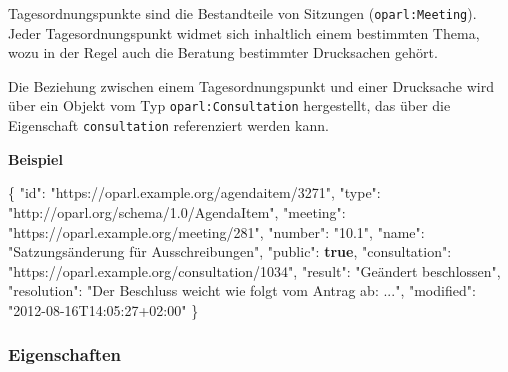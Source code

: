 \documentclass[,a4paper]{article}
\newenvironment{Shaded}{}{}
\newcommand{\KeywordTok}[1]{\textcolor[rgb]{0.00,0.44,0.13}{\textbf{{#1}}}}
\newcommand{\DataTypeTok}[1]{\textcolor[rgb]{0.56,0.13,0.00}{{#1}}}
\newcommand{\StringTok}[1]{\textcolor[rgb]{0.25,0.44,0.63}{{#1}}}
\newcommand{\FunctionTok}[1]{\textcolor[rgb]{0.02,0.16,0.49}{{#1}}}
\begin{document}

Tagesordnungspunkte sind die Bestandteile von Sitzungen
(\texttt{oparl:Meeting}). Jeder Tagesordnungspunkt widmet sich
inhaltlich einem bestimmten Thema, wozu in der Regel auch die Beratung
bestimmter Drucksachen gehört.

Die Beziehung zwischen einem Tagesordnungspunkt und einer Drucksache
wird über ein Objekt vom Typ \texttt{oparl:Consultation} hergestellt,
das über die Eigenschaft \texttt{consultation} referenziert werden kann.

\textbf{Beispiel}

\begin{Shaded}
\begin{Highlighting}[]
\FunctionTok{\{}
    \DataTypeTok{"id"}\FunctionTok{:} \StringTok{"https://oparl.example.org/agendaitem/3271"}\FunctionTok{,}
    \DataTypeTok{"type"}\FunctionTok{:} \StringTok{"http://oparl.org/schema/1.0/AgendaItem"}\FunctionTok{,}
    \DataTypeTok{"meeting"}\FunctionTok{:} \StringTok{"https://oparl.example.org/meeting/281"}\FunctionTok{,}
    \DataTypeTok{"number"}\FunctionTok{:} \StringTok{"10.1"}\FunctionTok{,}
    \DataTypeTok{"name"}\FunctionTok{:} \StringTok{"Satzungsänderung für Ausschreibungen"}\FunctionTok{,}
    \DataTypeTok{"public"}\FunctionTok{:} \KeywordTok{true}\FunctionTok{,}
    \DataTypeTok{"consultation"}\FunctionTok{:} \StringTok{"https://oparl.example.org/consultation/1034"}\FunctionTok{,}
    \DataTypeTok{"result"}\FunctionTok{:} \StringTok{"Geändert beschlossen"}\FunctionTok{,}
    \DataTypeTok{"resolution"}\FunctionTok{:} \StringTok{"Der Beschluss weicht wie folgt vom Antrag ab: ..."}\FunctionTok{,}
    \DataTypeTok{"modified"}\FunctionTok{:} \StringTok{"2012-08-16T14:05:27+02:00"}
\FunctionTok{\}}
\end{Highlighting}
\end{Shaded}

\subsubsection{Eigenschaften}\label{eigenschaften-5}
\end{document}
